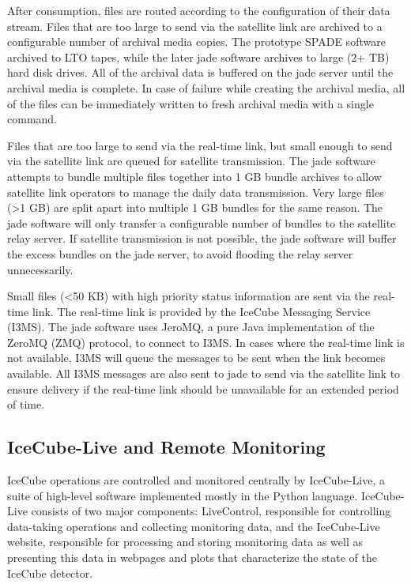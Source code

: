 After consumption, files are routed according to the configuration of their data stream. Files that are too large to send via the satellite link are archived to
a configurable number of archival media copies. The prototype SPADE software archived to LTO tapes, while the later jade software archives to large (2+ TB) hard
disk drives. All of the archival data is buffered on the jade server until the archival media is complete. In case of failure while creating the archival media, 
all of the files can be immediately written to fresh archival media with a single command.

Files that are too large to send via the real-time link, but small enough to send via the satellite link are queued for satellite transmission. The jade software
attempts to bundle multiple files together into 1 GB bundle archives to allow satellite link operators to manage the daily data transmission. Very large files
(>1 GB) are split apart into multiple 1 GB bundles for the same reason. The jade software will only transfer a configurable number of bundles to the satellite
relay server. If satellite transmission is not possible, the jade software will buffer the excess bundles on the jade server, to avoid flooding the relay server
unnecessarily.


Small files (<50 KB) with high priority status information are sent via the real-time link. The real-time link is provided by the IceCube Messaging Service
(I3MS). The jade software uses JeroMQ, a pure Java implementation of the ZeroMQ (ZMQ) protocol, to connect to I3MS. In cases where the real-time link is not
available, I3MS will queue the messages to be sent when the link becomes available. All I3MS messages are also sent to jade to send via the satellite link to
ensure delivery if the real-time link should be unavailable for an extended period of time.

\subsection{IceCube-Live and Remote Monitoring}

IceCube operations are controlled and monitored centrally by IceCube-Live, a suite of high-level software implemented mostly in the Python language.
IceCube-Live consists of two major components: LiveControl, responsible for controlling data-taking operations and
collecting monitoring data, and the IceCube-Live website, responsible for processing and storing monitoring data as well as presenting this data
in webpages and plots that characterize the state of the IceCube detector.


